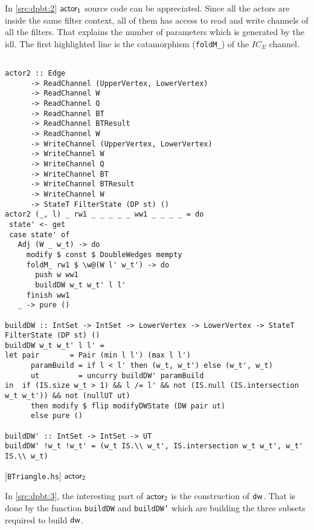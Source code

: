 In \autoref{src:dpbt:2} $\mathsf{actor_1}$ source code can be appreciated. Since all the actors are inside the same filter context, all of them has access to read and write
channels of all the filters. That explains the number of parameters which is generated by the \acrshort{idl}.
The first highlighted line is the catamorphism (\texttt{foldM_}) of the $IC_E$ channel. 

\begin{listing}[H]
\begin{verbatim}

actor2 :: Edge
      -> ReadChannel (UpperVertex, LowerVertex)
      -> ReadChannel W
      -> ReadChannel Q
      -> ReadChannel BT
      -> ReadChannel BTResult
      -> ReadChannel W
      -> WriteChannel (UpperVertex, LowerVertex)
      -> WriteChannel W
      -> WriteChannel Q
      -> WriteChannel BT
      -> WriteChannel BTResult
      -> WriteChannel W
      -> StateT FilterState (DP st) ()
actor2 (_, l) _ rw1 _ _ _ _ _ ww1 _ _ _ _ = do
 state' <- get
 case state' of
   Adj (W _ w_t) -> do
     modify $ const $ DoubleWedges mempty
     foldM_ rw1 $ \w@(W l' w_t') -> do
       push w ww1
       buildDW w_t w_t' l l'
     finish ww1
   _ -> pure ()

buildDW :: IntSet -> IntSet -> LowerVertex -> LowerVertex -> StateT FilterState (DP st) ()
buildDW w_t w_t' l l' =
let pair       = Pair (min l l') (max l l')
      paramBuild = if l < l' then (w_t, w_t') else (w_t', w_t)
      ut         = uncurry buildDW' paramBuild
in  if (IS.size w_t > 1) && l /= l' && not (IS.null (IS.intersection w_t w_t')) && not (nullUT ut)
      then modify $ flip modifyDWState (DW pair ut)
      else pure ()

buildDW' :: IntSet -> IntSet -> UT
buildDW' !w_t !w_t' = (w_t IS.\\ w_t', IS.intersection w_t w_t', w_t' IS.\\ w_t)

\end{verbatim}
\caption{[\texttt{BTriangle.hs}] $\ab$}
\label{src:dpbt:3}
\end{listing}

In \autoref{src:dpbt:3}, the interesting part of $\mathsf{actor_2}$ is the construction of $\mathsf{dw}$. That is done by the function \texttt{buildDW}
and \texttt{buildDW'} which are building the three subsets required to build $\mathsf{dw}$.

